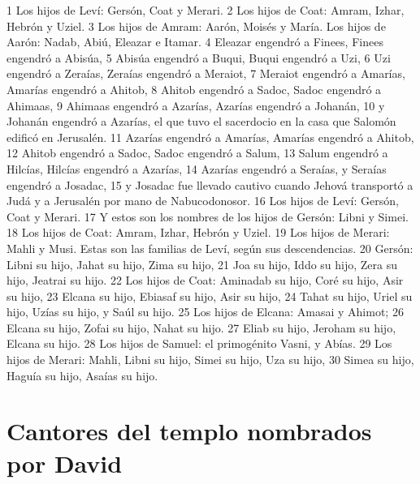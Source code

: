 1 Los hijos de Leví: Gersón, Coat y Merari.
2 Los hijos de Coat: Amram, Izhar, Hebrón y Uziel.
3 Los hijos de Amram: Aarón, Moisés y María. Los hijos de Aarón: Nadab, Abiú, Eleazar e Itamar.
4 Eleazar engendró a Finees, Finees engendró a Abisúa,
5 Abisúa engendró a Buqui, Buqui engendró a Uzi,
6 Uzi engendró a Zeraías, Zeraías engendró a Meraiot,
7 Meraiot engendró a Amarías, Amarías engendró a Ahitob,
8 Ahitob engendró a Sadoc, Sadoc engendró a Ahimaas,
9 Ahimaas engendró a Azarías, Azarías engendró a Johanán,
10 y Johanán engendró a Azarías, el que tuvo el sacerdocio en la casa que Salomón edificó en Jerusalén.
11 Azarías engendró a Amarías, Amarías engendró a Ahitob,
12 Ahitob engendró a Sadoc, Sadoc engendró a Salum,
13 Salum engendró a Hilcías, Hilcías engendró a Azarías,
14 Azarías engendró a Seraías, y Seraías engendró a Josadac,
15 y Josadac fue llevado cautivo cuando Jehová transportó a Judá y a Jerusalén por mano de Nabucodonosor.
16 Los hijos de Leví: Gersón, Coat y Merari.
17 Y estos son los nombres de los hijos de Gersón: Libni y Simei.
18 Los hijos de Coat: Amram, Izhar, Hebrón y Uziel.
19 Los hijos de Merari: Mahli y Musi. Estas son las familias de Leví, según sus descendencias. 
20 Gersón: Libni su hijo, Jahat su hijo, Zima su hijo,
21 Joa su hijo, Iddo su hijo, Zera su hijo, Jeatrai su hijo.
22 Los hijos de Coat: Aminadab su hijo, Coré su hijo, Asir su hijo,
23 Elcana su hijo, Ebiasaf su hijo, Asir su hijo,
24 Tahat su hijo, Uriel su hijo, Uzías su hijo, y Saúl su hijo.
25 Los hijos de Elcana: Amasai y Ahimot;
26 Elcana su hijo, Zofai su hijo, Nahat su hijo.
27 Eliab su hijo, Jeroham su hijo, Elcana su hijo.
28 Los hijos de Samuel: el primogénito Vasni, y Abías.
29 Los hijos de Merari: Mahli, Libni su hijo, Simei su hijo, Uza su hijo,
30 Simea su hijo, Haguía su hijo, Asaías su hijo.
\section*{Cantores del templo nombrados por David}

